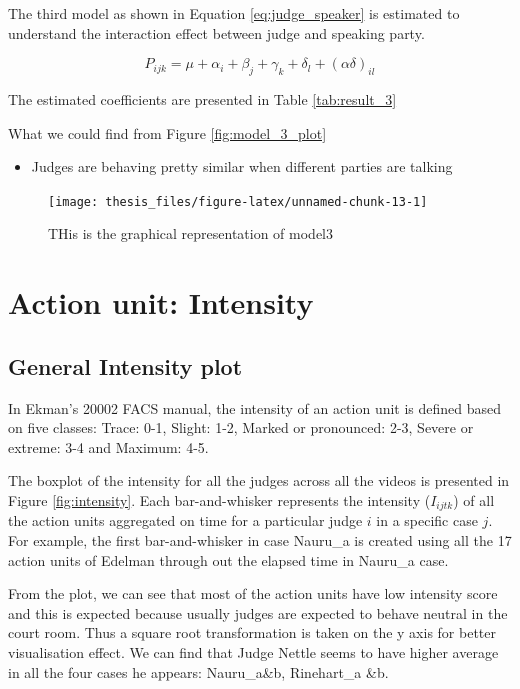 \documentclass{monashthesis}
\begin{document}
The third model as shown in Equation \ref{eq:judge_speaker} is estimated to understand the interaction effect between judge and speaking party.

\begin{equation}\label{eq:judge_speaker}
P_{ijk} = \mu + \alpha_i + \beta_j +\gamma_k + \delta_l + (\alpha\delta)_{il}
\end{equation}

The estimated coefficients are presented in Table \ref{tab:result_3}

What we could find from Figure \ref{fig:model_3_plot}

\begin{itemize}
\tightlist
\item
  Judges are behaving pretty similar when different parties are talking
\end{itemize}

\begin{figure}
\texttt{[image: thesis\_files/figure-latex/unnamed-chunk-13-1]} \caption{THis is the graphical representation of model3\label{fig:model_3_plot}}\label{fig:unnamed-chunk-13}
\end{figure}

\hypertarget{action-unit-intensity}{%
\section{Action unit: Intensity}\label{action-unit-intensity}}

\hypertarget{general-intensity-plot}{%
\subsection{General Intensity plot}\label{general-intensity-plot}}

In Ekman's 20002 FACS manual, the intensity of an action unit is defined based on five classes: Trace: 0-1, Slight: 1-2, Marked or pronounced: 2-3, Severe or extreme: 3-4 and Maximum: 4-5.

The boxplot of the intensity for all the judges across all the videos is presented in Figure \ref{fig:intensity}. Each bar-and-whisker represents the intensity (\(I_{ijtk}\)) of all the action units aggregated on time for a particular judge \(i\) in a specific case \(j\). For example, the first bar-and-whisker in case Nauru\_a is created using all the 17 action units of Edelman through out the elapsed time in Nauru\_a case.

From the plot, we can see that most of the action units have low intensity score and this is expected because usually judges are expected to behave neutral in the court room. Thus a square root transformation is taken on the y axis for better visualisation effect. We can find that Judge Nettle seems to have higher average in all the four cases he appears: Nauru\_a\&b, Rinehart\_a \&b.
\end{document}
